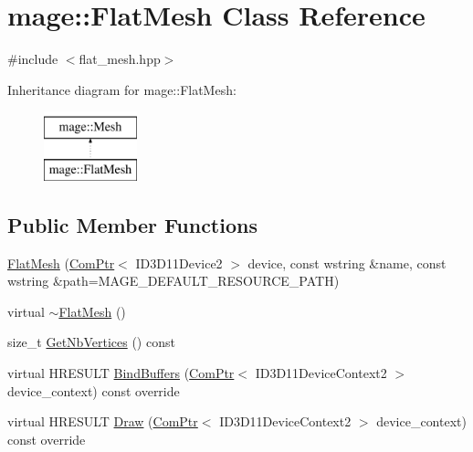 \hypertarget{classmage_1_1_flat_mesh}{}\section{mage\+:\+:Flat\+Mesh Class Reference}
\label{classmage_1_1_flat_mesh}


{\ttfamily \#include $<$flat\+\_\+mesh.\+hpp$>$}

Inheritance diagram for mage\+:\+:Flat\+Mesh\+:\begin{figure}[H]
\begin{center}
\leavevmode
\includegraphics[height=2.000000cm]{classmage_1_1_flat_mesh}
\end{center}
\end{figure}
\subsection*{Public Member Functions}
\begin{DoxyCompactItemize}
\item 
\hyperlink{classmage_1_1_flat_mesh_a3601359187c439b73ab21e86b88d9231}{Flat\+Mesh} (\hyperlink{namespacemage_ae74f374780900893caa5555d1031fd79}{Com\+Ptr}$<$ I\+D3\+D11\+Device2 $>$ device, const wstring \&name, const wstring \&path=M\+A\+G\+E\+\_\+\+D\+E\+F\+A\+U\+L\+T\+\_\+\+R\+E\+S\+O\+U\+R\+C\+E\+\_\+\+P\+A\+TH)
\item 
virtual \hyperlink{classmage_1_1_flat_mesh_a33986ef3664f055566af473f34843582}{$\sim$\+Flat\+Mesh} ()
\item 
size\+\_\+t \hyperlink{classmage_1_1_flat_mesh_a88f69dd4fa4a1d09db67b6cc32e909ba}{Get\+Nb\+Vertices} () const
\item 
virtual H\+R\+E\+S\+U\+LT \hyperlink{classmage_1_1_flat_mesh_a3d7a8793a2b802aa51ae91517201af6d}{Bind\+Buffers} (\hyperlink{namespacemage_ae74f374780900893caa5555d1031fd79}{Com\+Ptr}$<$ I\+D3\+D11\+Device\+Context2 $>$ device\+\_\+context) const override
\item 
virtual H\+R\+E\+S\+U\+LT \hyperlink{classmage_1_1_flat_mesh_a84cf747d30acb8cb12ed730cb1b73a14}{Draw} (\hyperlink{namespacemage_ae74f374780900893caa5555d1031fd79}{Com\+Ptr}$<$ I\+D3\+D11\+Device\+Context2 $>$ device\+\_\+context) const override
\end{DoxyCompactItemize}
